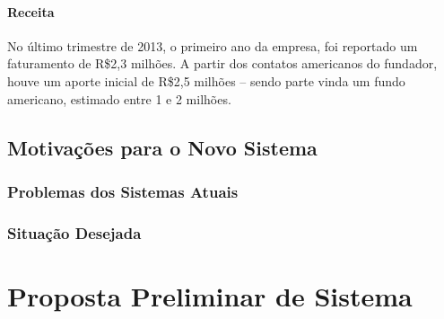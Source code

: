 \documentclass[12pt,a4paper,twoside,hyphens,english,brazil]{abntex2}
\begin{document}
\subsubsection*{Receita}
No último trimestre de 2013, o primeiro ano da empresa, foi reportado um faturamento de R\$2,3 milhões. A partir dos contatos americanos do fundador, houve um aporte inicial de R\$2,5 milhões -- sendo parte vinda um fundo americano, estimado entre 1 e 2 milhões.\cite{ingresse-hypeness}



\section{Motivações para o Novo Sistema}

\subsection{Problemas dos Sistemas Atuais}

\subsection{Situação Desejada}

\chapter{Proposta Preliminar de Sistema}

\end{document}
